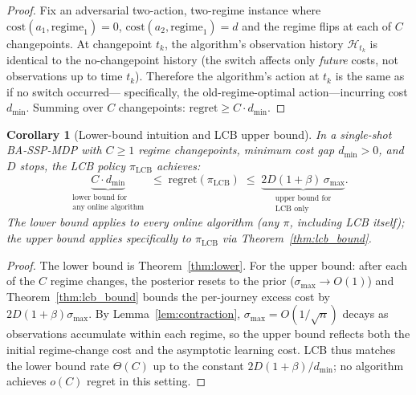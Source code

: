 \documentclass[11pt]{article}
\newtheorem{corollary}[theorem]{Corollary}
\theoremstyle{definition}
\theoremstyle{remark}
\begin{document}
\begin{proof}
Fix an adversarial two-action, two-regime instance where
$\mathrm{cost}(a_1, \text{regime}_1) = 0$, $\mathrm{cost}(a_2, \text{regime}_1) = d$
and the regime flips at each of $C$ changepoints.
At changepoint $t_k$, the algorithm's observation history $\mathcal{H}_{t_k}$
is identical to the no-changepoint history (the switch affects only
\emph{future} costs, not observations up to time $t_k$).
Therefore the algorithm's action at $t_k$ is the same as if no switch occurred---
specifically, the old-regime-optimal action---incurring cost $d_{\min}$.
Summing over $C$ changepoints: $\mathrm{regret} \geq C \cdot d_{\min}$.
\end{proof}

\begin{corollary}[Lower-bound intuition and LCB upper bound]\label{cor:sandwich}
In a single-shot BA-SSP-MDP with $C \geq 1$ regime changepoints,
minimum cost gap $d_{\min}>0$, and $D$ stops, the LCB policy
$\pi_{\mathrm{LCB}}$ achieves:
\[
\underbrace{C \cdot d_{\min}}_{\substack{\text{lower bound for}\\
\text{any online algorithm}}}
\;\leq\; \mathrm{regret}(\pi_{\mathrm{LCB}})
\;\leq\; \underbrace{2D(1+\beta)\,\sigma_{\max}}_{\substack{\text{upper bound for}\\
\text{LCB only}}}.
\]
The lower bound applies to every online algorithm (any
$\pi$, including LCB itself); the upper bound applies specifically
to $\pi_{\mathrm{LCB}}$ via Theorem~\ref{thm:lcb_bound}.
\end{corollary}

\begin{proof}
The lower bound is Theorem~\ref{thm:lower}.
For the upper bound: after each of the $C$ regime changes, the posterior
resets to the prior ($\sigma_{\max} \to O(1)$) and Theorem~\ref{thm:lcb_bound}
bounds the per-journey excess cost by $2D(1+\beta)\sigma_{\max}$.
By Lemma~\ref{lem:contraction}, $\sigma_{\max} = O(1/\sqrt{n})$ decays as
observations accumulate within each regime, so the upper bound reflects
both the initial regime-change cost and the asymptotic learning cost.
LCB thus matches the lower bound rate $\Theta(C)$ up to the constant
$2D(1+\beta)/d_{\min}$; no algorithm achieves $o(C)$ regret in this setting.
\end{proof}
\end{document}
